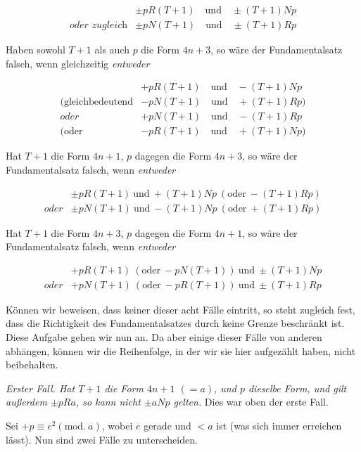 \[
\begin{array}{ll}&\pm pR(T+1)\quad\text{und}\quad\pm(T+1)Np\\\textit{oder zugleich}&\pm pN(T+1)\quad\text{und}\quad\pm(T+1)Rp\end{array}
\]

Haben sowohl $T+1$ als auch $p$ die Form $4n+3$, so wäre der Fundamentalsatz falsch, wenn gleichzeitig \emph{entweder}

\[
\begin{array}{ll}&+pR(T+1)\quad\text{und}\quad-(T+1)Np\\\text{(gleichbedeutend}&-pN(T+1)\quad\text{und}\quad+(T+1)Rp)\\\textit{oder}&+pN(T+1)\quad\text{und}\quad-(T+1)Rp\\\text{(oder}&-pR(T+1)\quad\text{und}\quad+(T+1)Np)\end{array}
\]

Hat $T+1$ die Form $4n+1$, $p$ dagegen die Form $4n+3$, so wäre der Fundamentalsatz falsch, wenn \emph{entweder}

\[
\begin{array}{ll}&\pm pR(T+1)\ \text{und}\ +(T+1)Np\ (\text{oder}\ -(T+1)Rp)\\\textit{oder}&\pm pN(T+1)\ \text{und}\ -(T+1)Np\ (\text{oder}\ +(T+1)Rp)\end{array}
\]

Hat $T+1$ die Form $4n+3$, $p$ dagegen die Form $4n+1$, so wäre der Fundamentalsatz falsch, wenn \emph{entweder}

\[
\begin{array}{ll}&+pR(T+1)\ (\text{oder}\ -pN(T+1))\ \text{und}\ \pm(T+1)Np\\\textit{oder}&+pN(T+1)\ (\text{oder}\ -pR(T+1))\ \text{und}\ \pm(T+1)Rp\end{array}
\]

Können wir beweisen, dass keiner dieser acht Fälle eintritt, so steht zugleich fest, dass die Richtigkeit des Fundamentalsatzes durch keine Grenze beschränkt ist. Diese Aufgabe gehen wir nun an. Da aber einige dieser Fälle von anderen abhängen, können wir die Reihenfolge, in der wir sie hier aufgezählt haben, nicht beibehalten.

\emph{Erster Fall. Hat $T+1$ die Form $4n+1$ $(=a)$, und $p$ dieselbe Form, und gilt außerdem $\pm pRa$, so kann nicht $\pm aNp$ gelten.} Dies war oben der erste Fall.

Sei $+p\equiv e^2(\mathrm{mod.}\ a)$, wobei $e$ gerade und $<a$ ist (was sich immer erreichen lässt). Nun sind zwei Fälle zu unterscheiden.

